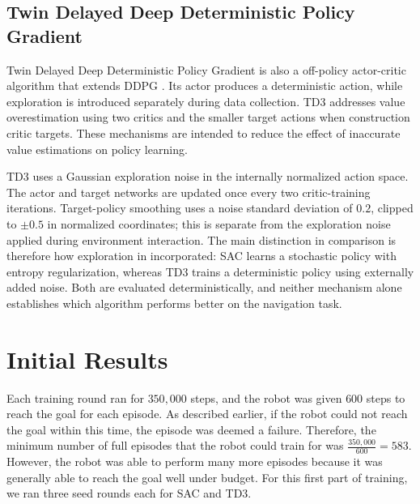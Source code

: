 \documentclass[conference, 11pt]{IEEEtran}
\begin{document}
\subsection{Twin Delayed Deep Deterministic Policy Gradient}
Twin Delayed Deep Deterministic Policy Gradient is also a off-policy actor-critic algorithm that extends DDPG \cite{continuous-control-deep-rl}.
Its actor produces a deterministic action, while exploration is introduced separately during data collection. 
TD3 addresses value overestimation using two critics and the smaller target actions when construction critic targets.
These mechanisms are intended to reduce the effect of inaccurate value estimations on policy learning. 

TD3 uses a Gaussian exploration noise in the internally normalized action space. 
The actor and target networks are updated once every two critic-training iterations. 
Target-policy smoothing uses a noise standard deviation of $0.2$, clipped to $\pm 0.5$ in normalized coordinates; this is separate from the exploration noise applied during environment interaction.
The main distinction in comparison is therefore how exploration in incorporated: SAC learns a stochastic policy with entropy regularization, whereas TD3 trains a deterministic policy using externally added noise. 
Both are evaluated deterministically, and neither mechanism alone establishes which algorithm performs better on the navigation task. 

\section{Initial Results} \label{initial-results}
Each training round ran for $350,000$ steps, and the robot was given $600$ steps to reach the goal for each episode. As described earlier, if the robot could not reach the goal within this time, the episode was deemed a failure. Therefore, the minimum number of full episodes that the robot could train for was $\frac{350,000}{600} = 583$. However, the robot was able to perform many more episodes because it was generally able to reach the goal well under budget. For this first part of training, we ran three seed rounds each for SAC and TD3.
\end{document}
